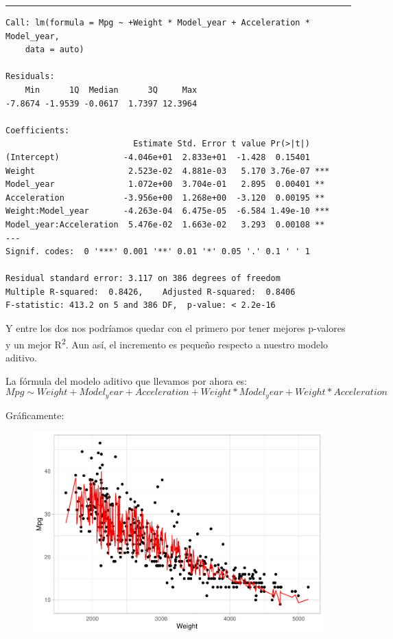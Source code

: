 \begin{center}\rule{\linewidth}{0.5pt}\end{center}

\begin{verbatim}
Call: lm(formula = Mpg ~ +Weight * Model_year + Acceleration * Model_year, 
    data = auto)

Residuals:
    Min      1Q  Median      3Q     Max 
-7.8674 -1.9539 -0.0617  1.7397 12.3964 

Coefficients:
                          Estimate Std. Error t value Pr(>|t|)    
(Intercept)             -4.046e+01  2.833e+01  -1.428  0.15401    
Weight                   2.523e-02  4.881e-03   5.170 3.76e-07 ***
Model_year               1.072e+00  3.704e-01   2.895  0.00401 ** 
Acceleration            -3.956e+00  1.268e+00  -3.120  0.00195 ** 
Weight:Model_year       -4.263e-04  6.475e-05  -6.584 1.49e-10 ***
Model_year:Acceleration  5.476e-02  1.663e-02   3.293  0.00108 ** 
---
Signif. codes:  0 '***' 0.001 '**' 0.01 '*' 0.05 '.' 0.1 ' ' 1

Residual standard error: 3.117 on 386 degrees of freedom
Multiple R-squared:  0.8426,    Adjusted R-squared:  0.8406 
F-statistic: 413.2 on 5 and 386 DF,  p-value: < 2.2e-16
\end{verbatim}

Y entre los dos nos podríamos quedar con el primero por tener mejores p-valores y un mejor R\textsuperscript{2}. Aun así, el incremento es pequeño respecto a nuestro modelo aditivo.

\vspace{\baselineskip}

La fórmula del modelo aditivo que llevamos por ahora es:
\begin{equation}
    Mpg \sim Weight + Model_year + Acceleration + Weight*Model_year + Weight*Acceleration
\end{equation}

Gráficamente:
\begin{figure}[H]\includegraphics[width=.9\linewidth]{img/Regresion_files/figure-latex/unnamed-chunk-16-1} \caption{}\end{figure}

